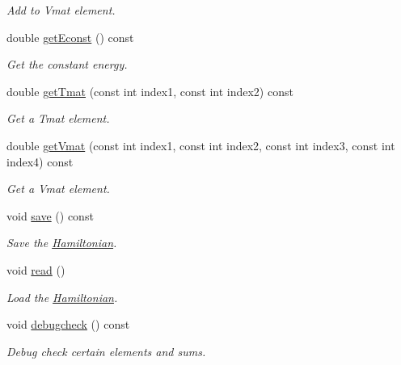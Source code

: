 \begin{DoxyCompactItemize}
\begin{DoxyCompactList}\small\item\em Add to Vmat element. \end{DoxyCompactList}\item 
double \hyperlink{classCheMPS2_1_1Hamiltonian_a031fa6987b304e3a7f6114b9f2e1f2ab}{get\-Econst} () const 
\begin{DoxyCompactList}\small\item\em Get the constant energy. \end{DoxyCompactList}\item 
double \hyperlink{classCheMPS2_1_1Hamiltonian_ac0b8314dc6133642997e648d1169d10f}{get\-Tmat} (const int index1, const int index2) const 
\begin{DoxyCompactList}\small\item\em Get a Tmat element. \end{DoxyCompactList}\item 
double \hyperlink{classCheMPS2_1_1Hamiltonian_af2d3836be75d50640cbed9a9234af126}{get\-Vmat} (const int index1, const int index2, const int index3, const int index4) const 
\begin{DoxyCompactList}\small\item\em Get a Vmat element. \end{DoxyCompactList}\item 
\hypertarget{classCheMPS2_1_1Hamiltonian_a7d1e514143996895015413c50770990d}{void \hyperlink{classCheMPS2_1_1Hamiltonian_a7d1e514143996895015413c50770990d}{save} () const }\label{classCheMPS2_1_1Hamiltonian_a7d1e514143996895015413c50770990d}

\begin{DoxyCompactList}\small\item\em Save the \hyperlink{classCheMPS2_1_1Hamiltonian}{Hamiltonian}. \end{DoxyCompactList}\item 
\hypertarget{classCheMPS2_1_1Hamiltonian_a5c1030ac14e2d82ae6e89b8dc65c9ddf}{void \hyperlink{classCheMPS2_1_1Hamiltonian_a5c1030ac14e2d82ae6e89b8dc65c9ddf}{read} ()}\label{classCheMPS2_1_1Hamiltonian_a5c1030ac14e2d82ae6e89b8dc65c9ddf}

\begin{DoxyCompactList}\small\item\em Load the \hyperlink{classCheMPS2_1_1Hamiltonian}{Hamiltonian}. \end{DoxyCompactList}\item 
\hypertarget{classCheMPS2_1_1Hamiltonian_a4f7527a7bf071f46d0f71c47de85c343}{void \hyperlink{classCheMPS2_1_1Hamiltonian_a4f7527a7bf071f46d0f71c47de85c343}{debugcheck} () const }\label{classCheMPS2_1_1Hamiltonian_a4f7527a7bf071f46d0f71c47de85c343}

\begin{DoxyCompactList}\small\item\em Debug check certain elements and sums. \end{DoxyCompactList}\end{DoxyCompactItemize}


